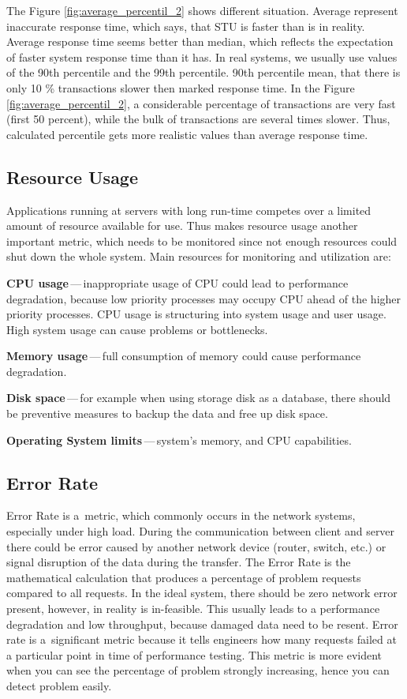 The Figure \ref{fig:average_percentil_2} shows different situation. Average represent inaccurate response time, which says, that STU is faster than is in reality. Average response time seems better than median, which reflects the expectation of faster system response time than it has. In real systems, we usually use values of the 90th percentile and the 99th percentile. 90th percentile mean, that there is only 10 \% transactions slower then marked response time. In the Figure \ref{fig:average_percentil_2}, a considerable percentage of transactions are very fast (first 50 percent), while the bulk of transactions are several times slower. Thus, calculated percentile gets more realistic values than average response time.

\subsection{Resource Usage}
Applications running at servers with long run-time competes over a limited amount of resource available for use. Thus makes resource usage another important metric, which needs to be monitored since not enough resources could shut down the whole system. Main resources for monitoring and utilization are:

\begin{description}
	\setlength\itemsep{0em}
	\item \textbf{CPU usage}\,---\,inappropriate usage of CPU could lead to performance degradation, because low priority processes may occupy CPU ahead of the higher priority processes. CPU usage is structuring into system usage and user usage. High system usage can cause problems or bottlenecks.
	\item \textbf{Memory usage}\,---\,full consumption of memory could cause performance degradation.
	\item \textbf{Disk space}\,---\,for example when using storage disk as a database, there should be preventive measures to backup the data and free up disk space.
	\item \textbf{Operating System limits}\,---\,system's memory, and CPU capabilities.
\end{description}


\subsection{Error Rate}
Error Rate is a~metric, which commonly occurs in the network systems, especially under high load. During the communication between client and server there could be error caused by another network device (router, switch, etc.) or signal disruption of the data during the transfer. The Error Rate is the mathematical calculation that produces a percentage of problem requests compared to all requests. In the ideal system, there should be zero network error present, however, in reality is in-feasible. This usually leads to a performance degradation and low throughput, because damaged data need to be resent.
Error rate is a~significant metric because it tells engineers how many requests failed at a particular point in time of performance testing. This metric is more evident when you can see the percentage of problem strongly increasing, hence you can detect problem easily.


